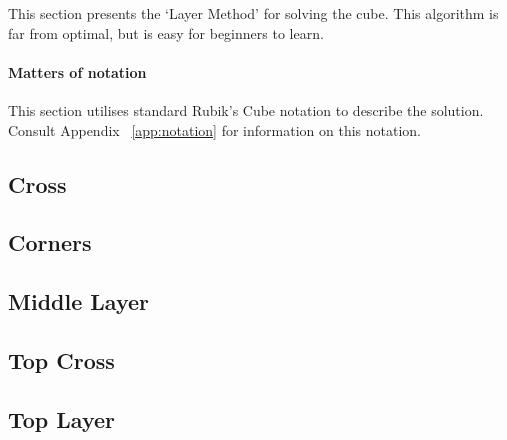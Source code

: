 This section presents the `Layer Method' for solving the cube. This algorithm is far from optimal, but is easy for beginners to learn.

\paragraph{Matters of notation} This section utilises standard Rubik's Cube notation to describe the solution. Consult Appendix ~\ref{app:notation} for information on this notation.


\subsection{Cross}

\subsection{Corners}

\subsection{Middle Layer}

\subsection{Top Cross}

\subsection{Top Layer}
